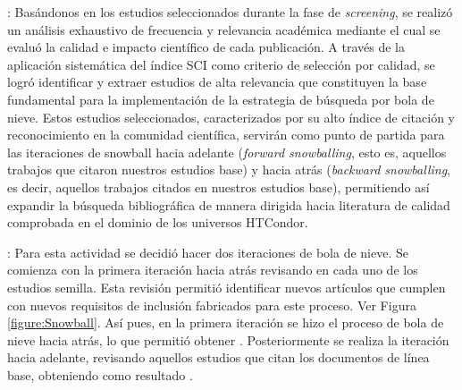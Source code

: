 
: Basándonos en los \screenTot{} estudios seleccionados durante la fase de \textit{screening}, se realizó un análisis exhaustivo de frecuencia y relevancia académica mediante el cual se evaluó la calidad e impacto científico de cada publicación. A través de la aplicación sistemática del índice SCI  como criterio de selección por calidad, se logró identificar y extraer \csiSelected{} estudios de alta relevancia que constituyen la base fundamental para la implementación de la estrategia de búsqueda por bola de nieve. Estos estudios seleccionados, caracterizados por su alto índice de citación y reconocimiento en la comunidad científica, servirán como punto de partida para las iteraciones de snowball hacia adelante (\textit{forward snowballing}, esto es, aquellos trabajos que citaron nuestros estudios base) y hacia atrás (\textit{backward snowballing}, es decir, aquellos trabajos citados en nuestros estudios base), permitiendo así expandir la búsqueda bibliográfica de manera dirigida hacia literatura de calidad comprobada en el dominio de los universos HTCondor.


: Para esta actividad se decidió hacer dos iteraciones de bola de nieve. Se comienza con la primera iteración hacia atrás revisando en cada uno de los \csiSelected{} estudios semilla. Esta revisión permitió identificar nuevos artículos que cumplen con nuevos requisitos de inclusión fabricados para este proceso. Ver Figura \ref{figure:Snowball}. Así pues, en la primera iteración se hizo el proceso de bola de nieve hacia atrás, lo que permitió obtener \firstBackwardSnowballStudies.  Posteriormente se realiza la iteración hacia adelante, revisando aquellos estudios que citan los documentos de línea base, obteniendo como resultado \firstForwardSnowballStudies{}.

